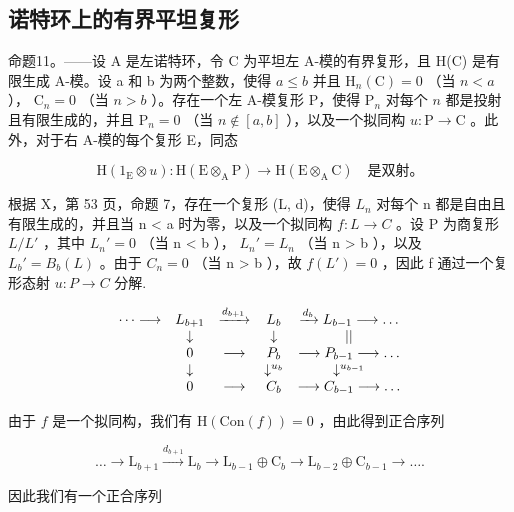 \subsection{诺特环上的有界平坦复形}

命题11。——设 A 是左诺特环，令 C 为平坦左 A-模的有界复形，且 H(C) 是有限生成 A-模。设 a 和 b 为两个整数，使得 \(a \leqslant b\) 并且 \(\mathrm{H}_{n}(\mathrm{C}) = 0\) （当 \(n < a\) ）， \(\mathrm{C}_{n} = 0\) （当 \(n > b\) ）。存在一个左 A-模复形 P，使得 \(\mathrm{P}_{n}\) 对每个 \(n\) 都是投射且有限生成的，并且 \(\mathrm{P}_{n} = 0\) （当 \(n \notin [a, b]\) ），以及一个拟同构 \(u: \mathrm{P} \to \mathrm{C}\) 。此外，对于右 A-模的每个复形 E，同态

\[
\mathrm{H} \left(1 _ {\mathrm{E}} \otimes u\right): \mathrm{H} (\mathrm{E} \otimes_ {\mathrm{A}} \mathrm{P}) \rightarrow \mathrm{H} (\mathrm{E} \otimes_ {\mathrm{A}} \mathrm{C}) \quad \text{是双射。}
\]

根据 X，第 53 页，命题 7，存在一个复形 (L, d)，使得 \(L_{n}\) 对每个 n 都是自由且有限生成的，并且当 n \textless{} a 时为零，以及一个拟同构 \(f: L \to C\) 。设 P 为商复形 \(L/L'\) ，其中 \(L_{n}' = 0\) （当 n \textless{} b ）， \(L_{n}' = L_{n}\) （当 n \textgreater{} b ），以及 \(L_{b}' = B_{b}(L)\) 。由于 \(C_{n} = 0\) （当 n \textgreater{} b ），故 \(f(L') = 0\) ，因此 f 通过一个复形态射 \(u: P \to C\) 分解.

\[
\begin{array}{c c c c c} \dots \longrightarrow & L _ {b + 1} & \xrightarrow {d _ {b + 1}} & L _ {b} & \xrightarrow {d _ {b}} L _ {b - 1} \longrightarrow \dots \\ & \downarrow & & \downarrow & | | \\ & 0 & \longrightarrow & P _ {b} & \longrightarrow P _ {b - 1} \longrightarrow \dots \\ & \downarrow & & \downarrow^ {u _ {b}} & \downarrow^ {u _ {b - 1}} \\ & 0 & \longrightarrow & C _ {b} & \longrightarrow C _ {b - 1} \longrightarrow \dots \end{array}
\]

由于 \(f\) 是一个拟同构，我们有 \(\mathrm{H}(\mathrm{Con}(f)) = 0\) ，由此得到正合序列

\[
\dots \rightarrow \mathrm{L} _ {b + 1} \xrightarrow {d _ {b + 1}} \mathrm{L} _ {b} \longrightarrow \mathrm{L} _ {b - 1} \oplus \mathrm{C} _ {b} \longrightarrow \mathrm{L} _ {b - 2} \oplus \mathrm{C} _ {b - 1} \rightarrow \dots .
\]

因此我们有一个正合序列

